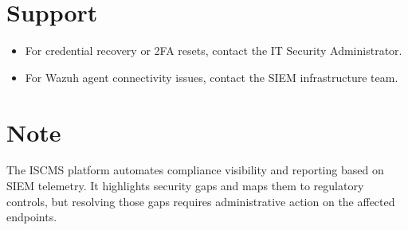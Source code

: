 \section{Support}
\begin{itemize}
    \item For credential recovery or 2FA resets, contact the IT Security Administrator.
    \item For Wazuh agent connectivity issues, contact the SIEM infrastructure team.
\end{itemize}

\section{Note}
The ISCMS platform automates compliance visibility and reporting based on SIEM telemetry. It highlights security gaps and maps them to regulatory controls, but resolving those gaps requires administrative action on the affected endpoints.
